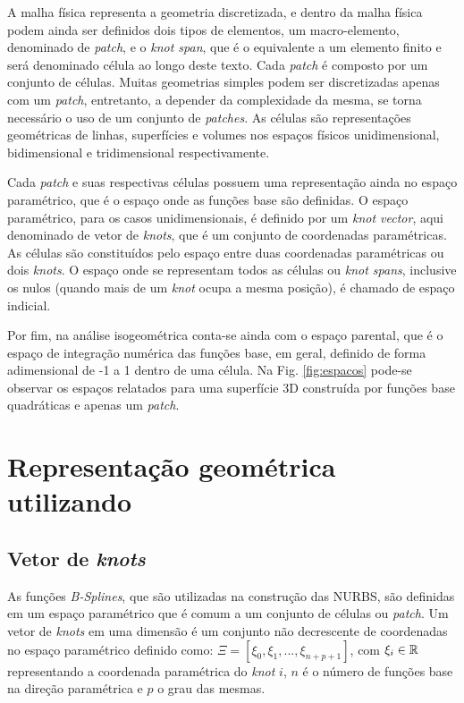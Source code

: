 \documentclass[tese_patricia]{subfiles}
\begin{document}
A malha física representa a geometria discretizada, e dentro da malha física podem ainda ser definidos dois tipos de elementos, um macro-elemento, denominado de \textit{patch}, e o \textit{knot span}, que é o equivalente a um elemento finito e será denominado célula ao longo deste texto. Cada \textit{patch} é composto por um conjunto de células. Muitas geometrias simples podem ser discretizadas apenas com um \textit{patch}, entretanto, a depender da complexidade da mesma, se torna necessário o uso de um conjunto de \textit{patches}. As células são representações geométricas de linhas, superfícies e volumes nos espaços físicos unidimensional, bidimensional e tridimensional respectivamente.

Cada \textit{patch} e suas respectivas células possuem uma representação ainda no espaço paramétrico, que é o espaço onde as funções base são definidas. O espaço paramétrico, para os casos unidimensionais, é definido por um \textit{knot vector}, aqui denominado de vetor de \textit{knots}, que é um conjunto de coordenadas paramétricas. As células são constituídos pelo espaço entre duas coordenadas paramétricas ou dois \textit{knots}. O espaço onde se representam todos as células ou \textit{knot spans}, inclusive os nulos (quando mais de um \textit{knot} ocupa a mesma posição), é chamado de espaço indicial.

Por fim, na análise isogeométrica conta-se ainda com o espaço parental, que é o espaço de integração numérica das funções base, em geral, definido de forma adimensional de -1 a 1 dentro de uma célula. Na Fig. \ref{fig:espacos} pode-se observar os espaços relatados para uma superfície 3D construída por funções base quadráticas e apenas um \textit{patch}. 



\section{Re\-pre\-sen\-ta\-ção ge\-o\-mé\-tri\-ca u\-ti\-li\-zan\-do }

\subsection{Vetor de \textit{knots}}

As funções \textit{B-Splines}, que são utilizadas na construção das NURBS, são definidas em um espaço paramétrico que é comum a um conjunto de células ou \textit{patch}. Um vetor de \textit{knots} em uma dimensão é um conjunto não decrescente de coordenadas no espaço paramétrico definido como: $\Xi=\left[\xi_{0},\xi_{1},...,\xi_{n+p+1}\right]$,  com $\xi_{i}\in \mathbb{R}$ representando a coordenada paramétrica do \textit{knot} $i$, $n$ é o número de funções base na direção paramétrica e $p$ o grau das mesmas.
\end{document}
